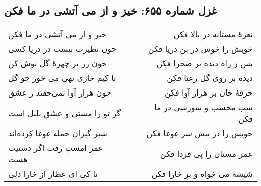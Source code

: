 \begin{center}
\section*{غزل شماره ۶۵۵: خیز و از می آتشی در ما فکن}
\label{sec:655}
\begin{longtable}{l p{0.5cm} r}
خیز و از می آتشی در ما فکن
&&
نعرهٔ مستانه در بالا فکن
\\
چون نظیرت نیست در دریا کسی
&&
خویش را خوش در بن دریا فکن
\\
خون رز بر چهرهٔ گل نوش کن
&&
پس ز راه دیده بر صحرا فکن
\\
تا کیم خاری نهی می خور چو گل
&&
دیده بر روی گل رعنا فکن
\\
چون هزار آوا نمی‌خفتد ز عشق
&&
خرقهٔ جان بر هزار آوا فکن
\\
گر تو را مستی و عشق بلبل است
&&
شب مخسب و شورشی در ما فکن
\\
شیر گیران جمله غوغا کرده‌اند
&&
خویش را در پیش سر غوغا فکن
\\
عمر امشب رفت اگر دستیت هست
&&
عمر مستان را پی فردا فکن
\\
تا کی ای عطار از خارا دلی
&&
شیشهٔ می خواه و بر خارا فکن
\\
\end{longtable}
\end{center}
